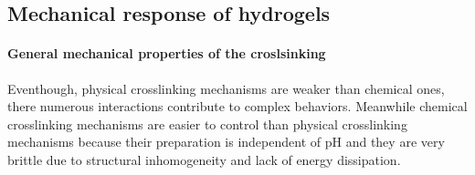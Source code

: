 \subsection{Mechanical response of hydrogels}\label{ch1:MechRepsonse}

\paragraph{General mechanical properties of the croslsinking}
Eventhough, physical crosslinking mechanisms are weaker than chemical ones, there numerous interactions contribute to complex behaviors.
Meanwhile chemical crosslinking mechanisms are easier to control than physical crosslinking mechanisms because their preparation is independent of pH\citep{bustamantetorresHydrogelsClassificationAccording2021} and they are very brittle due to structural inhomogeneity and lack of energy dissipation\citep{xuRoleChemicalPhysical2018}.


